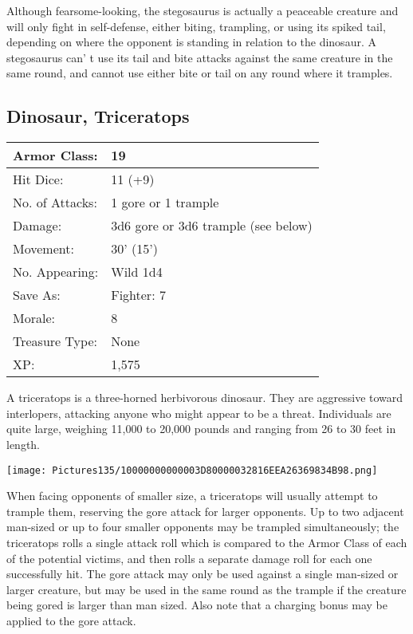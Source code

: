 \documentclass[a4paper,twoside,openany,10pt]{book}
\begin{document}
\begin{multicols}{2}
Although fearsome-looking, the stegosaurus is actually a peaceable creature and will only fight in self-defense, either biting, trampling, or using its spiked tail, depending on where the opponent is standing in relation to the dinosaur. A stegosaurus can' t use its tail and bite attacks against the same creature in the same round, and cannot use either bite or tail on any round where it tramples.

\subsection*{Dinosaur, Triceratops}\label{dinosaur-triceratops}

\begin{tabularx}{0.48\textwidth}{@{}lX@{}}
Armor Class: & 19 \\\hline
Hit Dice: & 11 (+9) \\\hline
No. of Attacks: & 1 gore or 1 trample \\\hline
Damage: & 3d6 gore or 3d6 trample (see below) \\\hline
Movement: & 30' (15') \\\hline
No. Appearing: & Wild 1d4 \\\hline
Save As: & Fighter: 7 \\\hline
Morale: & 8 \\\hline
Treasure Type: & None \\\hline
XP: & 1,575 \\\hline
\end{tabularx}\medskip

A triceratops is a three-horned herbivorous dinosaur. They are aggressive toward interlopers, attacking anyone who might appear to be a threat. Individuals are quite large, weighing 11,000 to 20,000 pounds and ranging from 26 to 30 feet in length.


\begin{center}
	\texttt{[image: Pictures135/10000000000003D80000032816EEA26369834B98.png]}
\end{center}

When facing opponents of smaller size, a triceratops will usually attempt to trample them, reserving the gore attack for larger opponents. Up to two adjacent man-sized or up to four smaller opponents may be trampled simultaneously; the triceratops rolls a single attack roll which is compared to the Armor Class of each of the potential victims, and then rolls a separate damage roll for each one successfully hit. The gore attack may only be used against a single man-sized or larger creature, but may be used in the same round as the trample if the creature being gored is larger than man sized. Also note that a charging bonus may be applied to the gore attack.



\end{multicols}
\end{document}
